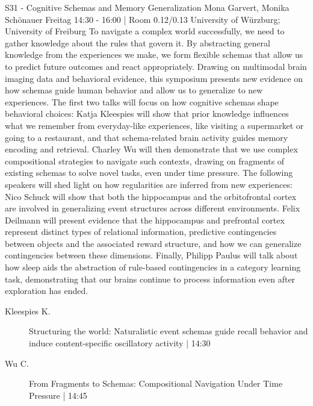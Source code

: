
            \begin{symposium}
            {S31 - Cognitive Schemas and Memory Generalization}
            {Mona Garvert, Monika Schönauer}
            {Freitag 14:30 - 16:00 | Room 0.12/0.13}
            {University of Würzburg; University of Freiburg}
            To navigate a complex world successfully, we need to gather knowledge about the rules that govern it. By abstracting general knowledge from the experiences we make, we form flexible schemas that allow us to predict future outcomes and react appropriately. Drawing on multimodal brain imaging data and behavioral evidence, this symposium presents new evidence on how schemas guide human behavior and allow us to generalize to new experiences. The first two talks will focus on how cognitive schemas shape behavioral choices: Katja Kleespies will show that prior knowledge influences what we remember from everyday-like experiences, like visiting a supermarket or going to a restaurant, and that schema-related brain activity guides memory encoding and retrieval. Charley Wu will then demonstrate that we use complex compositional strategies to navigate such contexts, drawing on fragments of existing schemas to solve novel tasks, even under time pressure. The following speakers will shed light on how regularities are inferred from new experiences: Nico Schuck will show that both the hippocampus and the orbitofrontal cortex are involved in generalizing event structures across different environments. Felix Deilmann will present evidence that the hippocampus and prefrontal cortex represent distinct types of relational information, predictive contingencies between objects and the associated reward structure, and how we can generalize contingencies between these dimensions. Finally, Philipp Paulus will talk about how sleep aids the abstraction of rule-based contingencies in a category learning task, demonstrating that our brains continue to process information even after exploration has ended.
            \begin{description}    
            
                \item [ Kleespies K.] Structuring the world: Naturalistic event schemas guide recall behavior and induce content-specific oscillatory activity \textcolor{mygray}{ | 14:30}    
                
                \item [ Wu C.] From Fragments to Schemas: Compositional Navigation Under Time Pressure \textcolor{mygray}{ | 14:45}    
                

\end{description}
\end{symposium}
